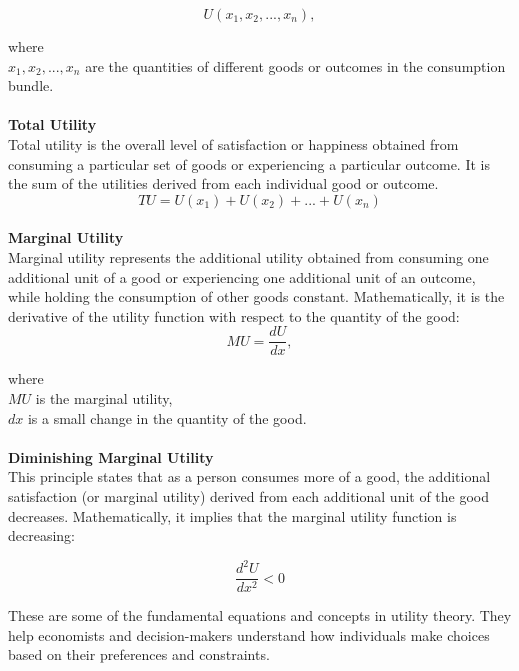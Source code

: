 \documentclass[12pt]{report}
\begin{document}
\begin{equation}
    U(x_1, x_2, ..., x_n),
\end{equation}

\noindent where\\
 \( x_1, x_2, ..., x_n \) are the quantities of different goods or outcomes in the
consumption bundle.\\
\\
\textbf{Total Utility}\\
Total utility is the overall level of satisfaction or happiness obtained from
consuming a particular set of goods or experiencing a particular outcome.
It is the sum of the utilities derived from each individual good or outcome.\\

\begin{equation}
    TU = U(x_1) + U(x_2) + ... + U(x_n)
\end{equation}
\\
\textbf{Marginal Utility}\\
Marginal utility represents the additional utility obtained from consuming one
additional unit of a good or experiencing one additional unit of an outcome,
while holding the consumption of other goods constant. Mathematically, it is
the derivative of the utility function with respect to the quantity of the good:\\

\begin{equation}
    MU = \frac{dU}{dx},
\end{equation}

\noindent where\\
\( MU \) is the marginal utility,\\
\( dx \) is a small change in the quantity of the good.\\
\\
\textbf{Diminishing Marginal Utility}\\
This principle states that as a person consumes more of a good, the additional
satisfaction (or marginal utility) derived from each additional unit of the good decreases.
Mathematically, it implies that the marginal utility function is decreasing:

\begin{equation}
    \frac{d^2U}{dx^2} < 0
\end{equation}

\noindent These are some of the fundamental equations and concepts in utility theory.
They help economists and decision-makers understand how individuals make choices based
on their preferences and constraints.
\end{document}

